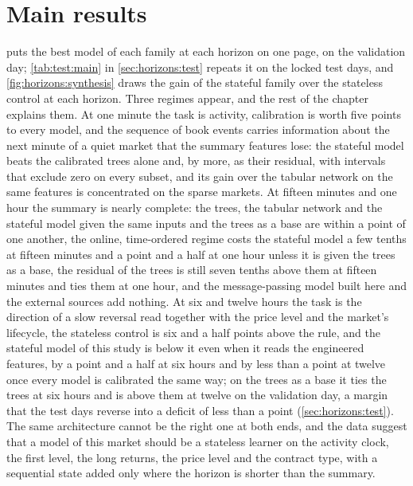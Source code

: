 \section{Main results}
\label{sec:main:results}
\label{sec:main:synthesis}
\label{sec:horizons:synthesis}

 puts the best model of each family at each horizon on one
page, on the validation day; \cref{tab:test:main} in \cref{sec:horizons:test} repeats it on
the locked test days, and \cref{fig:horizons:synthesis} draws the gain of the stateful
family over the stateless control at each horizon.  Three regimes appear, and the rest of
the chapter explains them.  At one minute the task is activity, calibration is worth five
points to every model, and the sequence of book events carries information about the next
minute of a quiet market that the summary features lose: the stateful model beats the
calibrated trees alone and, by more, as their residual, with intervals that exclude zero on
every subset, and its gain over the tabular network on the same features is concentrated on
the sparse markets.  At fifteen minutes and one hour the summary is nearly complete: the
trees, the tabular network and the stateful model given the same inputs and the trees as a
base are within a point of one another, the online, time-ordered regime costs the stateful
model a few tenths at fifteen minutes and a point and a half at one hour unless it is given
the trees as a base, the residual of the trees is still seven tenths above them at fifteen
minutes and ties them at one hour, and the message-passing model built here and the
external sources add nothing.  At six and
twelve hours the task is the direction of a slow reversal read together with the price
level and the market's lifecycle, the stateless control is six and a half points above the
rule, and
the stateful model of this study is below it even when it reads the engineered features,
by a point and a half at six hours and by less than a point at twelve once every model is
calibrated the same way; on the trees as a base it ties the trees at six hours and is above
them at twelve on the validation day, a margin that the test days reverse into a deficit of
less than a point (\cref{sec:horizons:test}).  The same architecture cannot be the right one at both ends, and the data suggest that a
model of this market should be a stateless learner on the activity
clock, the first level, the long returns, the price level and the contract type, with a
sequential state added only where the horizon is shorter than the summary.


